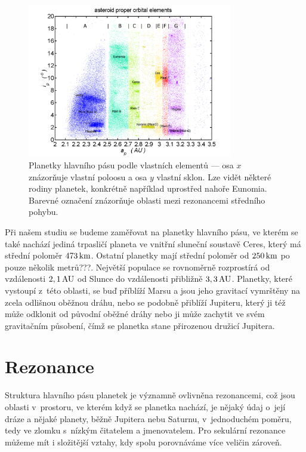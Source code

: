 \documentclass[A4paper, 12pt, oneside]{book}%
\begin{document}
\begin{figure}
	\centering
	\includegraphics[width=0.8\textwidth]{obr/mainbelt.png}
	\caption{Planetky hlavního pásu podle vlastních elementů --- osa $x$ znázorňuje vlastní poloosu a osa $y$ vlastní sklon. Lze vidět některé rodiny planetek, konkrétně například uprostřed nahoře Eunomia. Barevné označení znázorňuje oblasti mezi rezonancemi středního pohybu.} \label{fig:belt}
\end{figure}

Při našem studiu se budeme zaměřovat na planetky hlavního pásu, ve kterém se také nachází jediná trpasličí planeta ve vnitřní sluneční soustavě Ceres, který má střední poloměr $473\, {\rm km}$. Ostatní planetky mají střední poloměr od $250\, {\rm km}$ po pouze několik metrů???. Největší populace se rovnoměrně rozprostírá od vzdálenosti $2,1\, {\rm AU}$ od Slunce do vzdálenosti přibližně $3,3\, {\rm AU}$. Planetky, které vystoupí z~této oblasti, se buď příblíží Marsu a jsou jeho gravitací vymrštěny na zcela odlišnou oběžnou dráhu, nebo se podobně přiblíží Jupiteru, který ji též může odklonit od původní oběžné dráhy nebo ji může zachytit ve svém gravitačním působení, čímž se planetka stane přirozenou družicí Jupitera. 

\section{Rezonance}
Struktura hlavního pásu planetek je významně ovlivněna rezonancemi, což jsou oblasti v~prostoru, ve kterém když se planetka nachází, je nějaký údaj o~její dráze a nějaké planety, běžně Jupitera nebu Saturnu, v~jednoduchém poměru, tedy ve zlomku s~nízkým čitatelem a jmenovatelem. Pro sekulární rezonance můžeme mít i složitější vztahy, kdy spolu porovnáváme více veličin zároveň. 
\end{document}
